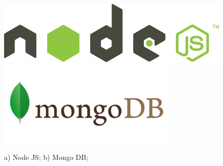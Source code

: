\begin{figure}[H]
    \centering
	\includegraphics[scale=0.15]{images/nodejs.png}
    \includegraphics[scale=0.3]{images/mongodb.png}
    \caption{a) Node JS; b) Mongo DB;}
\end{figure}

